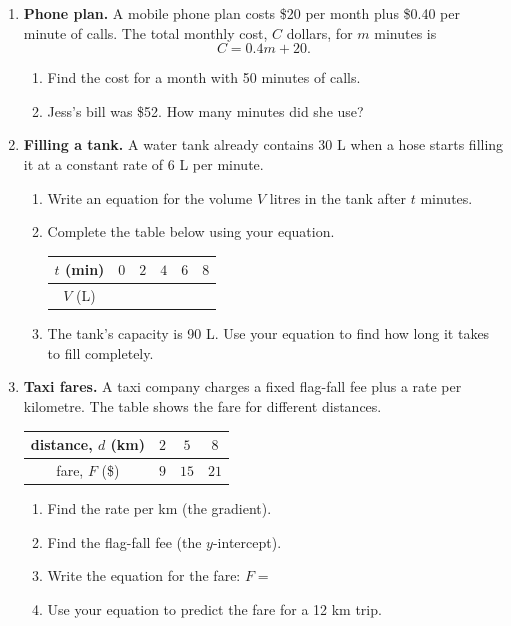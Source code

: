 \documentclass[11pt]{article}
\newcommand{\ans}{\hrulefill}
\begin{document}
\begin{enumerate}
  \item \textbf{Phone plan.} A mobile phone plan costs \$20 per month plus \$0.40 per minute of calls. The total monthly cost, $C$ dollars, for $m$ minutes is
  \[
    C = 0.4m + 20.
  \]
  \begin{enumerate}
    \item Find the cost for a month with 50 minutes of calls. \ans
    \item Jess's bill was \$52. How many minutes did she use? \ans
  \end{enumerate}

  \item \textbf{Filling a tank.} A water tank already contains 30 L when a hose starts filling it at a constant rate of 6 L per minute.
  \begin{enumerate}
    \item Write an equation for the volume $V$ litres in the tank after $t$ minutes. \ans
    \item Complete the table below using your equation.
    \begin{center}
    \begin{tabular}{|c|c|c|c|c|c|}
    \hline
    $t$ (min) & $0$ & $2$ & $4$ & $6$ & $8$ \\\hline
    $V$ (L) & & & & & \\\hline
    \end{tabular}
    \end{center}
    \item The tank's capacity is 90 L. Use your equation to find how long it takes to fill completely. \ans
  \end{enumerate}

  \item \textbf{Taxi fares.} A taxi company charges a fixed flag-fall fee plus a rate per kilometre. The table shows the fare for different distances.
  \begin{center}
  \begin{tabular}{|c|c|c|c|}
  \hline
  distance, $d$ (km) & $2$ & $5$ & $8$ \\\hline
  fare, $F$ (\$) & $9$ & $15$ & $21$ \\\hline
  \end{tabular}
  \end{center}
  \begin{enumerate}
    \item Find the rate per km (the gradient). \ans
    \item Find the flag-fall fee (the $y$-intercept). \ans
    \item Write the equation for the fare: $F = $ \ans
    \item Use your equation to predict the fare for a 12 km trip. \ans
  \end{enumerate}


\end{enumerate}
\end{document}
